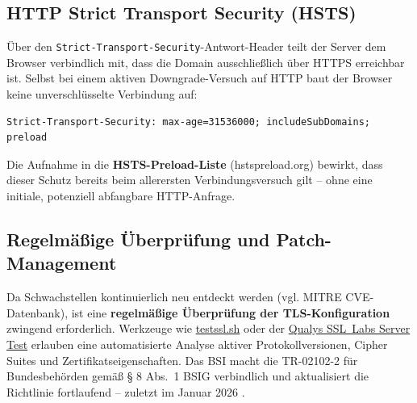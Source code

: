 \subsection*{HTTP Strict Transport Security (HSTS)}

Über den \texttt{Strict-Transport-Security}-Antwort-Header teilt der Server dem Browser verbindlich mit, dass die Domain ausschließlich über HTTPS erreichbar ist. Selbst bei einem aktiven Downgrade-Versuch auf HTTP baut der Browser keine unverschlüsselte Verbindung auf:

\begin{lstlisting}
Strict-Transport-Security: max-age=31536000; includeSubDomains; preload
\end{lstlisting}

Die Aufnahme in die \textbf{HSTS-Preload-Liste} (hstspreload.org) bewirkt, dass dieser Schutz bereits beim allerersten Verbindungsversuch gilt -- ohne eine initiale, potenziell abfangbare HTTP-Anfrage.

\subsection*{Regelmäßige Überprüfung und Patch-Management}

Da Schwachstellen kontinuierlich neu entdeckt werden (vgl. MITRE CVE-Datenbank), ist eine \textbf{regelmäßige Überprüfung der TLS-Konfiguration} zwingend erforderlich. Werkzeuge wie \href{https://testssl.sh}{testssl.sh} oder der \href{https://www.ssllabs.com/ssltest/}{Qualys SSL~Labs Server Test} erlauben eine automatisierte Analyse aktiver Protokollversionen, Cipher Suites und Zertifikatseigenschaften. Das BSI macht die TR-02102-2 für Bundesbehörden gemäß § 8 Abs.~1 BSIG verbindlich und aktualisiert die Richtlinie fortlaufend -- zuletzt im Januar 2026 \cite{kes-bsi-tr}.


